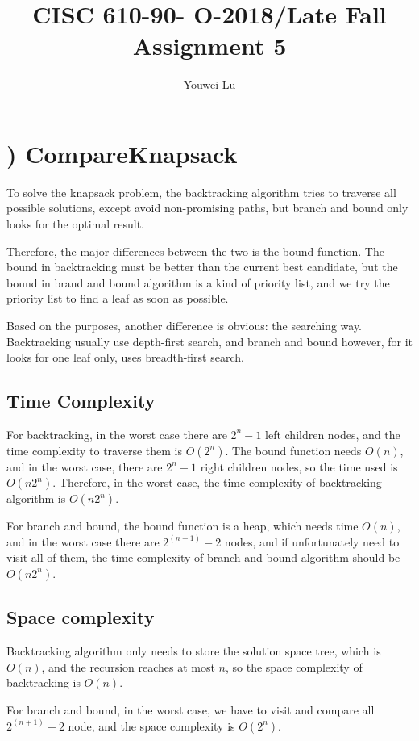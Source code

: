 \documentclass[natbib,12pt]{article}
\title{CISC 610-90- O-2018/Late Fall Assignment 5}
\author{Youwei Lu}
\date{}
\begin{document}
\maketitle


\section{) CompareKnapsack}
To solve the knapsack problem, the backtracking algorithm tries to traverse all possible solutions, except avoid non-promising paths, but branch and bound only looks for the optimal result. 

Therefore, the major differences between the two is the bound function. The bound in backtracking must be better than the current best candidate, but the bound in brand and bound algorithm is a kind of priority list, and we try the priority list to find a leaf as soon as possible. 

Based on the purposes, another difference is obvious: the searching way. Backtracking usually use depth-first search, and branch and bound however, for it looks for one leaf only, uses breadth-first search.

\subsection{Time Complexity}

For backtracking, in the worst case there are $2^n - 1$ left children nodes, and the time complexity to traverse them is $O(2^n)$. The bound function needs $O(n)$, and in the worst case, there are $2^n -1$ right children nodes, so the time used is $O(n2^n)$. Therefore, in the worst case, the time complexity of backtracking algorithm is $O(n2^n)$.

For branch and bound, the bound function is a heap, which needs time $O(n)$, and in the worst case there are $2^{(n + 1)} - 2$ nodes, and if unfortunately need to visit all of them, the time complexity of branch and bound algorithm should be $O(n2^n)$.

\subsection{Space complexity}

Backtracking algorithm only needs to store the solution space tree, which is $O(n)$, and the recursion reaches at most $n$, so the space complexity of backtracking is $O(n)$.

For branch and bound, in the worst case, we have to visit and compare all $2^{(n+1)}-2$ node, and the space complexity is $O(2^n)$.
\end{document}

